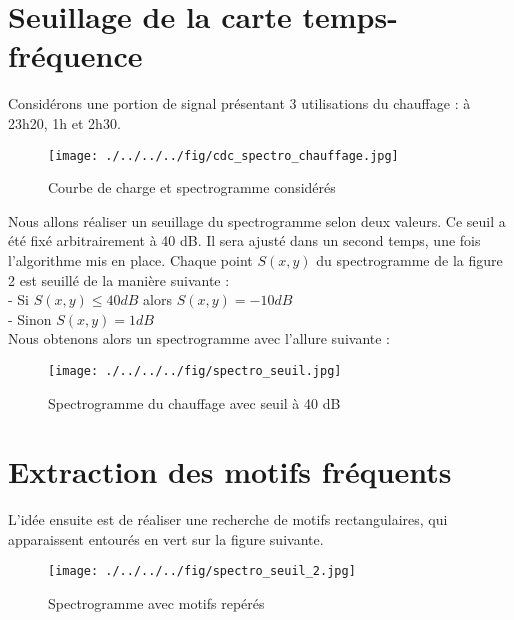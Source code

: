 \documentclass[10pt,a4paper]{article}
\begin{document}
\newpage

 
\section{Seuillage de la carte temps-fréquence}
Considérons une portion de signal présentant 3 utilisations du chauffage : à 23h20, 1h et 2h30.

\begin{figure}[!h]
\begin{center}
\texttt{[image: ./../../../fig/cdc\_spectro\_chauffage.jpg]}
\caption{Courbe de charge et spectrogramme considérés}
\label{Figure}
\end{center}
\end{figure}
 
Nous allons réaliser un seuillage du spectrogramme selon deux valeurs.
Ce seuil a été fixé arbitrairement à 40 dB. Il sera ajusté dans un second temps, une fois l'algorithme mis en place.
Chaque point $S(x,y)$ du spectrogramme de la figure 2 est seuillé de la manière suivante : \\
- Si $S(x,y) \le 40 dB$ alors $S(x,y) = -10 dB$ \\
- Sinon $S(x,y) = 1 dB$ \\

Nous obtenons alors un spectrogramme avec l'allure suivante :

\begin{figure}[!h]
\begin{center}
\texttt{[image: ./../../../fig/spectro\_seuil.jpg]}
\caption{Spectrogramme du chauffage avec seuil à 40 dB}
\label{Figure}
\end{center}
\end{figure}

\section{Extraction des motifs fréquents}
L'idée ensuite est de réaliser une recherche de motifs rectangulaires, qui apparaissent entourés en vert sur la figure suivante.

\begin{figure}[!h]
\begin{center}
\texttt{[image: ./../../../fig/spectro\_seuil\_2.jpg]}
\caption{Spectrogramme avec motifs repérés}
\label{Figure}
\end{center}
\end{figure}

\newpage
\end{document}
